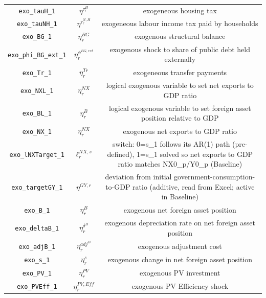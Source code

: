 \begin{center}
\begin{longtable}{ccc}
\texttt{exo\_tauH\_1} & ${\eta^{\tau^H_{r}}}$ & exogeneous housing tax\\
\texttt{exo\_tauNH\_1} & ${\eta^{\tau^{N,H}_{r}}}$ & exogeneous labour income tax paid by households\\
\texttt{exo\_BG\_1} & ${\eta^{BG}_{r}}$ & exogenous structural balance\\
\texttt{exo\_phi\_BG\_ext\_1} & ${\eta^{\phi^{BG,ext}}_{r}}$ & exogenous shock to share of public debt held externally\\
\texttt{exo\_Tr\_1} & ${\eta^{Tr}_r}$ & exogeneous transfer payments\\
\texttt{exo\_NXL\_1} & ${\eta^{NX}_r}$ & logical exogenous variable to set net exports to GDP ratio\\
\texttt{exo\_BL\_1} & ${\eta^{B}_r}$ & logical exogenous variable to set foreign asset position relative to GDP\\
\texttt{exo\_NX\_1} & ${\eta^{NX}_r}$ & exogenous net exports to GDP ratio\\
\texttt{exo\_lNXTarget\_1} & ${\ell^{NX,s}_r}$ & switch: 0=s\_1 follows its AR(1) path (pre-defined), 1=s\_1 solved so net exports to GDP ratio matches NX0\_p/Y0\_p (Baseline)\\
\texttt{exo\_targetGY\_1} & ${\eta^{GY,r}}$ & deviation from initial government-consumption-to-GDP ratio (additive, read from Excel; active in Baseline)\\
\texttt{exo\_B\_1} & ${\eta^{B}_r}$ & exogenous net foreign asset position\\
\texttt{exo\_deltaB\_1} & ${\eta^{\delta^B}_r}$ & exogenous depreciation rate on net foreign asset position\\
\texttt{exo\_adjB\_1} & ${\eta^{adj^B}_r}$ & exogenous adjustment cost\\
\texttt{exo\_s\_1} & ${\eta^{s}_r}$ & exogenous change in net foreign asset position\\
\texttt{exo\_PV\_1} & ${\eta^{PV}_r}$ & exogenous PV investment\\
\texttt{exo\_PVEff\_1} & ${\eta^{PV,Eff}_r}$ & exogenous PV Efficiency shock\\
\hline%
\end{longtable}
\end{center}
